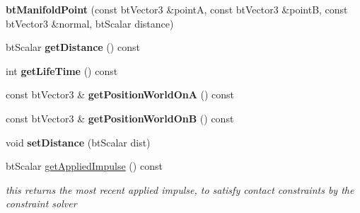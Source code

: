 \begin{DoxyCompactItemize}
\mbox{\label{classbtManifoldPoint_afe9cbdf9719330ba37bf4079c2896159}} 
{\bfseries bt\+Manifold\+Point} (const bt\+Vector3 \&pointA, const bt\+Vector3 \&pointB, const bt\+Vector3 \&normal, bt\+Scalar distance)
\item 
\mbox{\label{classbtManifoldPoint_a42cd47cba8f5e1e3f6c24c910224df6d}} 
bt\+Scalar {\bfseries get\+Distance} () const
\item 
\mbox{\label{classbtManifoldPoint_a4d4623c815e1713ac48026dcac4fcaf8}} 
int {\bfseries get\+Life\+Time} () const
\item 
\mbox{\label{classbtManifoldPoint_ac17f12f3990802262cbef0dc958a8e8b}} 
const bt\+Vector3 \& {\bfseries get\+Position\+World\+OnA} () const
\item 
\mbox{\label{classbtManifoldPoint_a4b1e20a2fe1675f32931d221046139d9}} 
const bt\+Vector3 \& {\bfseries get\+Position\+World\+OnB} () const
\item 
\mbox{\label{classbtManifoldPoint_a952646d751054a5c942e01198ab85cf3}} 
void {\bfseries set\+Distance} (bt\+Scalar dist)
\item 
\mbox{\label{classbtManifoldPoint_af731843210d9d3dace170d457d34c0b8}} 
bt\+Scalar \hyperlink{classbtManifoldPoint_af731843210d9d3dace170d457d34c0b8}{get\+Applied\+Impulse} () const
\begin{DoxyCompactList}\small\item\em this returns the most recent applied impulse, to satisfy contact constraints by the constraint solver \end{DoxyCompactList}\end{DoxyCompactItemize}
